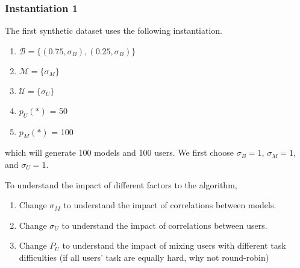 \subsubsection{Instantiation 1}

The first synthetic dataset uses the following instantiation.

\begin{enumerate}
\item $\mathcal{B} = \{(0.75, \sigma_{B}), (0.25, \sigma_{B})\}$
\item $\mathcal{M} = \{\sigma_{M}\}$
\item $\mathcal{U} = \{\sigma_U\}$
\item $p_U(*)$ = 50
\item $p_M(*)$ = 100
\end{enumerate}
which will generate 100 models and 100 users. We first
choose $\sigma_{B} = 1$, $\sigma_{M} = 1$, and $\sigma_{U} = 1$.

To understand the impact of different factors to the algorithm,
\begin{enumerate}
\item Change $\sigma_{M}$ to understand the impact of
correlations between models.
\item Change $\sigma_{U}$ to understand the impact of
correlations between users.
\item Change $P_U$ to understand the impact of
mixing users with different task difficulties (if all users' task are
equally hard, why not round-robin)
\end{enumerate}







